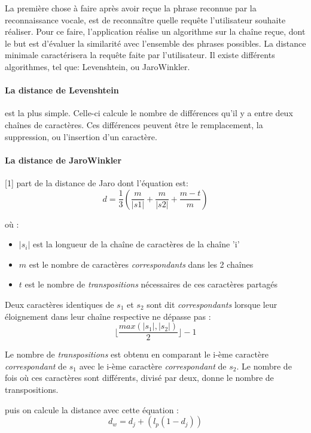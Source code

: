 La première chose à faire après avoir reçue la phrase reconnue par la reconnaissance vocale, est de 
reconnaître quelle requête l'utilisateur souhaite réaliser. Pour ce faire, l'application réalise un algorithme 
sur la chaîne reçue, dont le but est d'évaluer la similarité avec l'ensemble des 
phrases possibles. La distance minimale caractérisera la requête faite par l'utilisateur. Il existe 
différents algorithmes, tel que: Levenshtein, ou JaroWinkler.

\paragraph{La distance de Levenshtein}est la plus simple. Celle-ci calcule le nombre de différences 
qu'il y a entre deux chaînes de caractères. Ces différences peuvent être le remplacement, la suppression, ou 
l'insertion d'un caractère.

\paragraph{La distance de JaroWinkler}[1] part de la distance de Jaro dont l'équation est:
\begin{equation}
 d = \frac{1}{3}(\frac{m}{|s1|}+\frac{m}{|s2|}+\frac{m-t}{m})
\end{equation}

où :
\begin{itemize}
 \item $|s_i|$ est la longueur de la chaîne de caractères de la chaîne 'i'
 \item $m$ est le nombre de caractères \emph{correspondants} dans les 2 chaînes
 \item $t$ est le nombre de \emph{transpositions} nécessaires de ces caractères partagés
\end{itemize}

Deux caractères identiques de $s_1$ et $s_2$ sont dit \emph{correspondants} lorsque leur éloignement dans 
leur chaîne respective ne dépasse pas :
\begin{equation}
 \lfloor{\frac{max(|s_1|, |s_2|)}{2}}\rfloor - 1
\end{equation}

Le nombre de \emph{transpositions} est obtenu en comparant le i-ème caractère \emph{correspondant} de $s_1$ 
avec le i-ème caractère \emph{correspondant} de $s_2$. Le nombre de fois où ces caractères sont différents, 
divisé par deux, donne le nombre de transpositions.

puis on calcule la distance avec cette équation :
\begin{equation}
 d_w = d_j + (l_p(1-d_j))
\end{equation}

